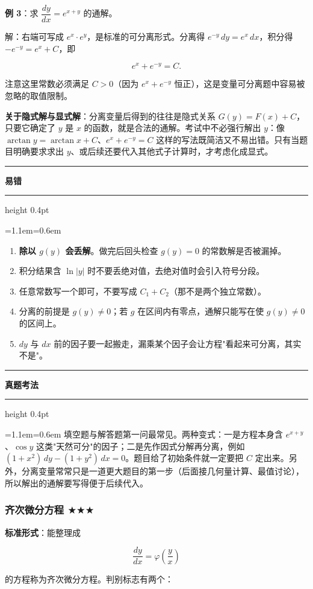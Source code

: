 \documentclass[11pt,openany,UTF8]{ctexbook}
\newcommand{\callouthead}[2]{%
  \par\addvspace{7pt}\noindent
  {\color{#1}\rule[-0.15em]{3pt}{1.05em}}\hspace{0.5em}%
  {\bfseries\color{#1}#2}\par\nobreak\vspace{-0.35em}%
  {\color{rulesep}\hrule height 0.4pt}\nobreak\vspace{0.45em}%
  \begingroup\small\setlength{\parindent}{0pt}%
  \leftskip=1.1em\rightskip=0.6em\noindent\ignorespaces}
\newcommand{\calloutend}{\par\endgroup\addvspace{7pt}}
\newenvironment{callwarn}[1]{\callouthead{warnbar}{#1}}{\calloutend}
\newenvironment{callexam}[1]{\callouthead{exambar}{#1}}{\calloutend}
\begin{document}
\textbf{例 3}：求 $\dfrac{dy}{dx}=e^{x+y}$ 的通解。

解：右端可写成 $e^{x}\cdot e^{y}$，是标准的可分离形式。分离得 $e^{-y}\,dy=e^{x}\,dx$，积分得 $-e^{-y}=e^{x}+C$，即

\[e^{x}+e^{-y}=C .\]

注意这里常数必须满足 $C>0$（因为 $e^{x}+e^{-y}$ 恒正），这是变量可分离题中容易被忽略的取值限制。

\textbf{关于隐式解与显式解}：分离变量后得到的往往是隐式关系 $G(y)=F(x)+C$，只要它确定了 $y$ 是 $x$ 的函数，就是合法的通解。考试中不必强行解出 $y$：像 $\arctan y=\arctan x+C$、$e^{x}+e^{-y}=C$ 这样的写法既简洁又不易出错。只有当题目明确要求求出 $y$、或后续还要代入其他式子计算时，才考虑化成显式。

\begin{callwarn}{易错}
\begin{enumerate}
\item \textbf{除以 $g(y)$ 会丢解}。做完后回头检查 $g(y)=0$ 的常数解是否被漏掉。
\item 积分结果含 $\ln\vert y\vert$ 时不要丢绝对值，去绝对值时会引入符号分段。
\item 任意常数写一个即可，不要写成 $C_1+C_2$（那不是两个独立常数）。
\item 分离的前提是 $g(y)\ne 0$；若 $g$ 在区间内有零点，通解只能写在使 $g(y)\ne 0$ 的区间上。
\item $dy$ 与 $dx$ 前的因子要一起搬走，漏乘某个因子会让方程"看起来可分离，其实不是"。
\end{enumerate}
\end{callwarn}

\begin{callexam}{真题考法}
填空题与解答题第一问最常见。两种变式：一是方程本身含 $e^{x+y}$、$\cos y$ 这类"天然可分"的因子；二是先作因式分解再分离，例如 $(1+x^2)\,dy-(1+y^2)\,dx=0$。题目给了初始条件就一定要把 $C$ 定出来。另外，分离变量常常只是一道更大题目的第一步（后面接几何量计算、最值讨论），所以解出的通解要写得便于后续代入。

\end{callexam}

\subsubsection{齐次微分方程 $\bigstar$$\bigstar$$\bigstar$}

\textbf{标准形式}：能整理成

\[\frac{dy}{dx}=\varphi\!\left(\frac{y}{x}\right)\]

的方程称为齐次微分方程。判别标志有两个：
\end{document}
